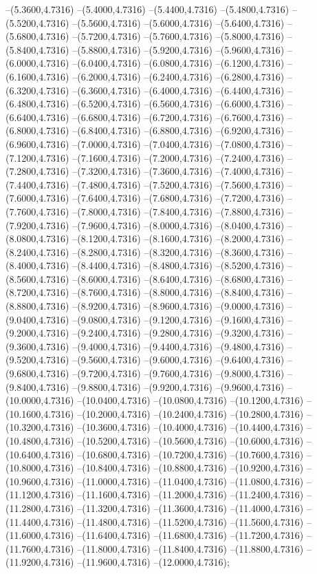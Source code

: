 {	--(5.3600,4.7316)
	--(5.4000,4.7316)
	--(5.4400,4.7316)
	--(5.4800,4.7316)
	--(5.5200,4.7316)
	--(5.5600,4.7316)
	--(5.6000,4.7316)
	--(5.6400,4.7316)
	--(5.6800,4.7316)
	--(5.7200,4.7316)
	--(5.7600,4.7316)
	--(5.8000,4.7316)
	--(5.8400,4.7316)
	--(5.8800,4.7316)
	--(5.9200,4.7316)
	--(5.9600,4.7316)
	--(6.0000,4.7316)
	--(6.0400,4.7316)
	--(6.0800,4.7316)
	--(6.1200,4.7316)
	--(6.1600,4.7316)
	--(6.2000,4.7316)
	--(6.2400,4.7316)
	--(6.2800,4.7316)
	--(6.3200,4.7316)
	--(6.3600,4.7316)
	--(6.4000,4.7316)
	--(6.4400,4.7316)
	--(6.4800,4.7316)
	--(6.5200,4.7316)
	--(6.5600,4.7316)
	--(6.6000,4.7316)
	--(6.6400,4.7316)
	--(6.6800,4.7316)
	--(6.7200,4.7316)
	--(6.7600,4.7316)
	--(6.8000,4.7316)
	--(6.8400,4.7316)
	--(6.8800,4.7316)
	--(6.9200,4.7316)
	--(6.9600,4.7316)
	--(7.0000,4.7316)
	--(7.0400,4.7316)
	--(7.0800,4.7316)
	--(7.1200,4.7316)
	--(7.1600,4.7316)
	--(7.2000,4.7316)
	--(7.2400,4.7316)
	--(7.2800,4.7316)
	--(7.3200,4.7316)
	--(7.3600,4.7316)
	--(7.4000,4.7316)
	--(7.4400,4.7316)
	--(7.4800,4.7316)
	--(7.5200,4.7316)
	--(7.5600,4.7316)
	--(7.6000,4.7316)
	--(7.6400,4.7316)
	--(7.6800,4.7316)
	--(7.7200,4.7316)
	--(7.7600,4.7316)
	--(7.8000,4.7316)
	--(7.8400,4.7316)
	--(7.8800,4.7316)
	--(7.9200,4.7316)
	--(7.9600,4.7316)
	--(8.0000,4.7316)
	--(8.0400,4.7316)
	--(8.0800,4.7316)
	--(8.1200,4.7316)
	--(8.1600,4.7316)
	--(8.2000,4.7316)
	--(8.2400,4.7316)
	--(8.2800,4.7316)
	--(8.3200,4.7316)
	--(8.3600,4.7316)
	--(8.4000,4.7316)
	--(8.4400,4.7316)
	--(8.4800,4.7316)
	--(8.5200,4.7316)
	--(8.5600,4.7316)
	--(8.6000,4.7316)
	--(8.6400,4.7316)
	--(8.6800,4.7316)
	--(8.7200,4.7316)
	--(8.7600,4.7316)
	--(8.8000,4.7316)
	--(8.8400,4.7316)
	--(8.8800,4.7316)
	--(8.9200,4.7316)
	--(8.9600,4.7316)
	--(9.0000,4.7316)
	--(9.0400,4.7316)
	--(9.0800,4.7316)
	--(9.1200,4.7316)
	--(9.1600,4.7316)
	--(9.2000,4.7316)
	--(9.2400,4.7316)
	--(9.2800,4.7316)
	--(9.3200,4.7316)
	--(9.3600,4.7316)
	--(9.4000,4.7316)
	--(9.4400,4.7316)
	--(9.4800,4.7316)
	--(9.5200,4.7316)
	--(9.5600,4.7316)
	--(9.6000,4.7316)
	--(9.6400,4.7316)
	--(9.6800,4.7316)
	--(9.7200,4.7316)
	--(9.7600,4.7316)
	--(9.8000,4.7316)
	--(9.8400,4.7316)
	--(9.8800,4.7316)
	--(9.9200,4.7316)
	--(9.9600,4.7316)
	--(10.0000,4.7316)
	--(10.0400,4.7316)
	--(10.0800,4.7316)
	--(10.1200,4.7316)
	--(10.1600,4.7316)
	--(10.2000,4.7316)
	--(10.2400,4.7316)
	--(10.2800,4.7316)
	--(10.3200,4.7316)
	--(10.3600,4.7316)
	--(10.4000,4.7316)
	--(10.4400,4.7316)
	--(10.4800,4.7316)
	--(10.5200,4.7316)
	--(10.5600,4.7316)
	--(10.6000,4.7316)
	--(10.6400,4.7316)
	--(10.6800,4.7316)
	--(10.7200,4.7316)
	--(10.7600,4.7316)
	--(10.8000,4.7316)
	--(10.8400,4.7316)
	--(10.8800,4.7316)
	--(10.9200,4.7316)
	--(10.9600,4.7316)
	--(11.0000,4.7316)
	--(11.0400,4.7316)
	--(11.0800,4.7316)
	--(11.1200,4.7316)
	--(11.1600,4.7316)
	--(11.2000,4.7316)
	--(11.2400,4.7316)
	--(11.2800,4.7316)
	--(11.3200,4.7316)
	--(11.3600,4.7316)
	--(11.4000,4.7316)
	--(11.4400,4.7316)
	--(11.4800,4.7316)
	--(11.5200,4.7316)
	--(11.5600,4.7316)
	--(11.6000,4.7316)
	--(11.6400,4.7316)
	--(11.6800,4.7316)
	--(11.7200,4.7316)
	--(11.7600,4.7316)
	--(11.8000,4.7316)
	--(11.8400,4.7316)
	--(11.8800,4.7316)
	--(11.9200,4.7316)
	--(11.9600,4.7316)
	--(12.0000,4.7316);
}
